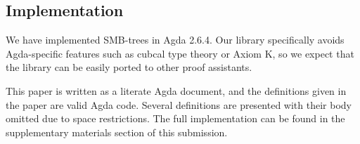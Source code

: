 \subsection{Implementation}

We have implemented SMB-trees in Agda 2.6.4.
Our library specifically avoids Agda-specific features
such as cubcal type theory or Axiom K, so we expect
that the library can be easily ported to other proof assistants.

This paper is written as a literate Agda document, and the definitions
given in the paper are valid Agda code.
Several definitions are presented with their body omitted due to
space restrictions. The full implementation can be found in the supplementary
materials section of this submission.
